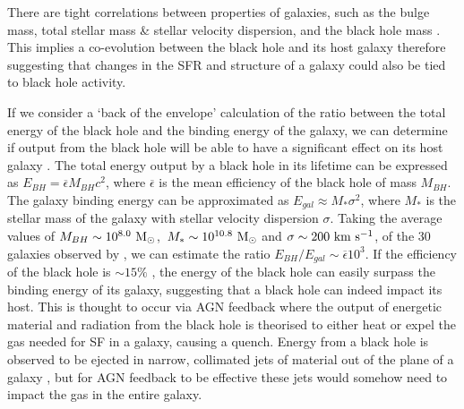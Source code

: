There are tight correlations between properties of galaxies, such as the bulge mass, total stellar mass \& stellar velocity dispersion, and the black hole mass \citep{magorrian98, marconi03, haringrix04}. This implies a co-evolution between the black hole and its host galaxy therefore suggesting that changes in the SFR and structure of a galaxy could also be tied to black hole activity. 

If we consider a `back of the envelope' calculation of the ratio between the total energy of the black hole and the binding energy of the galaxy, we can determine if output from the black hole will be able to have a significant effect on its host galaxy \citep[see p.649 of][]{mo10}. The total energy output by a black hole in its lifetime can be expressed as $E_{BH} = \overline{\epsilon}M_{BH}c^2$, where $\overline{\epsilon}$ is the mean efficiency of the black hole of mass $M_{BH}$. The galaxy binding energy can be approximated as $E_{gal} \approx M_{*}\sigma^2$, where $M_{*}$ is the stellar mass of the galaxy with stellar velocity dispersion $\sigma$. Taking the average values of $M_{BH} \sim 10^{8.0}~\rm{M}_{\odot}$,~$M_{*} \sim 10^{10.8}~\rm{M}_{\odot}$ and $\sigma \sim 200~\rm{km}~\rm{s}^{-1}$, of the 30 galaxies observed by \citet{haringrix04}, we can estimate the ratio $E_{BH}/E_{gal} \sim \overline{\epsilon} 10^3$. If the efficiency of the black hole is $\sim15\%$ \citep{elvis02}, the energy of the black hole can easily surpass the binding energy of its galaxy, suggesting that a black hole can indeed impact its host. This is thought to occur via AGN feedback where the output of energetic material and radiation from the black hole is theorised to either heat or expel the gas needed for SF in a galaxy, causing a quench. Energy from a black hole is observed to be ejected in narrow, collimated jets of material out of the plane of a galaxy \citep[see review by][]{homan12}, but for AGN feedback to be effective these jets would somehow need to impact the gas in the entire galaxy. 

